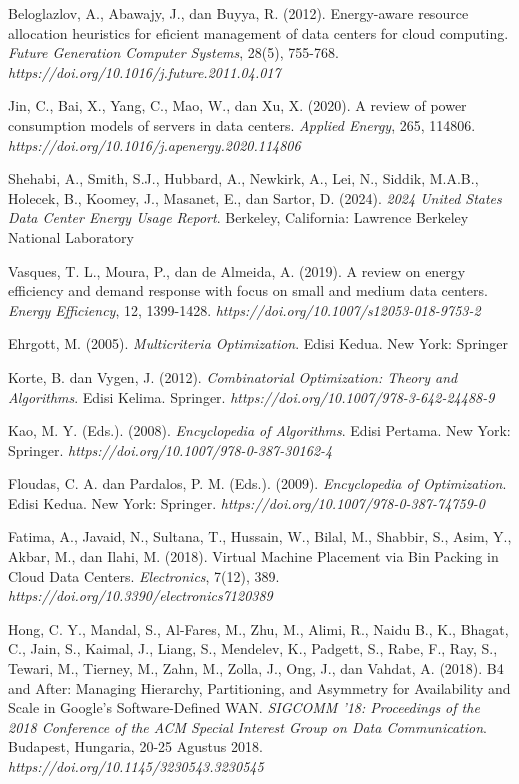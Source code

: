 \begin{thebibliography}{99}
Beloglazlov, A., Abawajy, J., dan Buyya, R. (2012). Energy-aware resource allocation heuristics for eficient management of data centers for cloud computing. \textit{Future Generation Computer Systems}, 28(5), 755-768. \textit{https://doi.org/10.1016/j.future.2011.04.017}


Jin, C., Bai, X., Yang, C., Mao, W., dan Xu, X. (2020). A review of power consumption models of servers in data centers. \textit{Applied Energy}, 265, 114806. \textit{https://doi.org/10.1016/j.apenergy.2020.114806}

Shehabi, A., Smith, S.J., Hubbard, A., Newkirk, A., Lei, N., Siddik, M.A.B., Holecek, B., Koomey,
J., Masanet, E., dan Sartor, D. (2024). \textit{2024 United States Data Center Energy Usage Report}. Berkeley, California: Lawrence Berkeley National Laboratory

Vasques, T. L., Moura, P., dan de Almeida, A. (2019). A review on energy efficiency and demand response with focus on small and medium data centers. \textit{Energy Efficiency}, 12, 1399-1428. \textit{https://doi.org/10.1007/s12053-018-9753-2}


Ehrgott, M. (2005). \textit{Multicriteria Optimization}. Edisi Kedua. New York: Springer 


Korte, B. dan Vygen, J. (2012). \textit{Combinatorial Optimization: Theory and Algorithms}. Edisi Kelima. Springer. \textit{https://doi.org/10.1007/978-3-642-24488-9}

Kao, M. Y. (Eds.). (2008). \textit{Encyclopedia of Algorithms}. Edisi Pertama. New York: Springer. \textit{https://doi.org/10.1007/978-0-387-30162-4}

Floudas, C. A. dan Pardalos, P. M. (Eds.). (2009). \textit{Encyclopedia of Optimization}. Edisi Kedua. New York: Springer. \textit{https://doi.org/10.1007/978-0-387-74759-0}

Fatima, A., Javaid, N., Sultana, T., Hussain, W., Bilal, M., Shabbir, S., Asim, Y., Akbar, M., dan Ilahi, M. (2018). Virtual Machine Placement via Bin Packing in Cloud Data Centers. \textit{Electronics}, 7(12), 389. \textit{https://doi.org/10.3390/electronics7120389} 


Hong, C. Y., Mandal, S., Al-Fares, M., Zhu, M., Alimi, R., Naidu B., K., Bhagat, C., Jain, S., Kaimal, J., Liang, S., Mendelev, K., Padgett, S., Rabe, F., Ray, S., Tewari, M., Tierney, M., Zahn, M., Zolla, J., Ong, J., dan Vahdat, A. (2018). B4 and After: Managing Hierarchy, Partitioning, and Asymmetry for Availability and Scale in Google’s Software-Defined WAN. \textit{SIGCOMM '18: Proceedings of the 2018 Conference of the ACM Special Interest Group on Data Communication}. Budapest, Hungaria, 20-25 Agustus 2018. \textit{https://doi.org/10.1145/3230543.3230545} 


\end{thebibliography}
